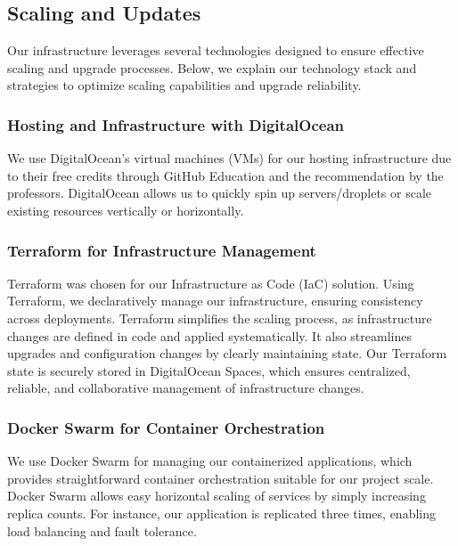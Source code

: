\subsection{Scaling and Updates}\label{scaling} %

Our infrastructure leverages several technologies designed to ensure effective scaling and upgrade processes. Below, we explain our technology stack and strategies to optimize scaling capabilities and upgrade reliability.

\subsubsection{Hosting and Infrastructure with DigitalOcean}

We use DigitalOcean's virtual machines (VMs) for our hosting infrastructure due to their free credits through GitHub Education and the recommendation by the professors. DigitalOcean allows us to quickly spin up servers/droplets or scale existing resources vertically or horizontally.

\subsubsection{Terraform for Infrastructure Management}

Terraform was chosen for our Infrastructure as Code (IaC) solution. Using Terraform, we declaratively manage our infrastructure, ensuring consistency across deployments. Terraform simplifies the scaling process, as infrastructure changes are defined in code and applied systematically. It also streamlines upgrades and configuration changes by clearly maintaining state. Our Terraform state is securely stored in DigitalOcean Spaces, which ensures centralized, reliable, and collaborative management of infrastructure changes.

\subsubsection{Docker Swarm for Container Orchestration}\label{section:swarm-setup}

We use Docker Swarm for managing our containerized applications, which provides straightforward container orchestration suitable for our project scale. Docker Swarm allows easy horizontal scaling of services by simply increasing replica counts. For instance, our application is replicated three times, enabling load balancing and fault tolerance.

